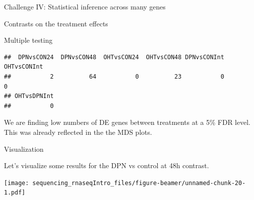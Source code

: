 \documentclass[ignorenonframetext,]{beamer}
\newenvironment{Shaded}{\begin{snugshade}}{\end{snugshade}}
\newcommand{\CommentTok}[1]{\textcolor[rgb]{0.56,0.35,0.01}{\textit{#1}}}
\newcommand{\DataTypeTok}[1]{\textcolor[rgb]{0.13,0.29,0.53}{#1}}
\newcommand{\DecValTok}[1]{\textcolor[rgb]{0.00,0.00,0.81}{#1}}
\newcommand{\FloatTok}[1]{\textcolor[rgb]{0.00,0.00,0.81}{#1}}
\newcommand{\KeywordTok}[1]{\textcolor[rgb]{0.13,0.29,0.53}{\textbf{#1}}}
\newcommand{\NormalTok}[1]{#1}
\newcommand{\OperatorTok}[1]{\textcolor[rgb]{0.81,0.36,0.00}{\textbf{#1}}}
\newcommand{\StringTok}[1]{\textcolor[rgb]{0.31,0.60,0.02}{#1}}
\begin{document}
\begin{frame}[fragile]{Challenge IV: Statistical inference across many
genes}
\begin{block}{Contrasts on the treatment effects}
\begin{block}{Multiple testing}
\begin{verbatim}
##  DPNvsCON24  DPNvsCON48  OHTvsCON24  OHTvsCON48 DPNvsCONInt OHTvsCONInt 
##           2          64           0          23           0           0 
## OHTvsDPNInt 
##           0
\end{verbatim}

We are finding low numbers of DE genes between treatments at a 5\% FDR
level. This was already reflected in the the MDS plots.

\end{block}

\begin{block}{Visualization}

Let's visualize some results for the DPN vs control at 48h contrast.

\begin{Shaded}
\end{Shaded}

\texttt{[image: sequencing\_rnaseqIntro\_files/figure-beamer/unnamed-chunk-20-1.pdf]}


\end{block}
\end{block}
\end{frame}
\end{document}
